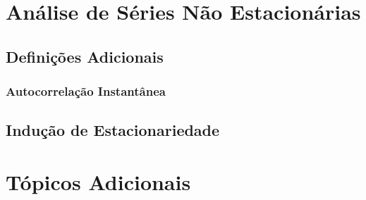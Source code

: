 \chapter{Análise de Séries Não Estacionárias}

\section{Definições Adicionais}
\subsection{Autocorrelação Instantânea}
\label{ssec:inst_autocorr}

\section{Indução de Estacionariedade}

\chapter{Tópicos Adicionais}
